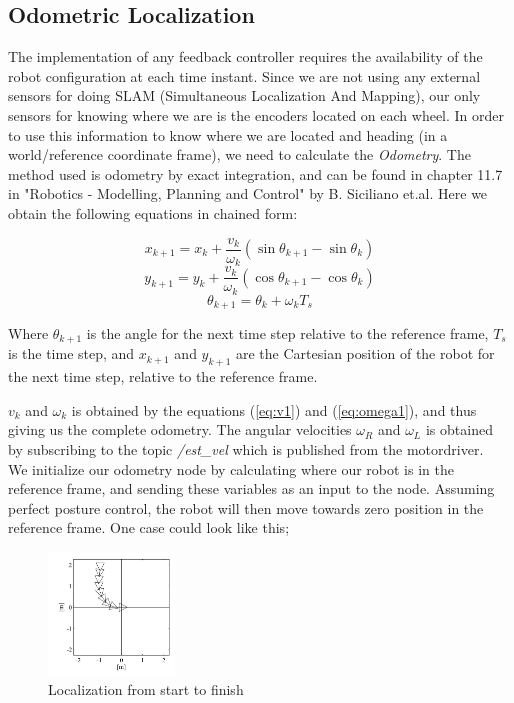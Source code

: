\documentclass[a4paper,10pt]{article}
\begin{document}
\subsection{Odometric Localization}

	The implementation of any feedback controller requires the availability of the robot configuration at each time instant. 
	Since we are not using any external sensors for doing SLAM
	(Simultaneous Localization And Mapping), our only sensors for knowing where we are is the encoders located on each wheel. 
	In order to use this information to know where we are located and heading (in a world/reference coordinate frame), 
	we need to calculate the \emph{Odometry}. The method used is odometry by exact integration, and can be found in chapter 11.7 in
	"Robotics - Modelling, Planning and Control" by B. Siciliano et.al. Here we obtain the following equations in chained form:
	
		\begin{equation}
		x_{k+1}=x_k+\frac{v_k}{\omega_k}(\sin{\theta_{k+1}}-\sin{\theta_k})
		\end{equation}
		\begin{equation}
		y_{k+1}=y_k+\frac{v_k}{\omega_k}(\cos{\theta_{k+1}}-\cos{\theta_k})
		\end{equation}
		\begin{equation}
		\theta_{k+1}=\theta_k+\omega_kT_s
		\end{equation}
		
		Where $\theta_{k+1}$ is the angle for the next time step relative to the reference frame, $T_s$ is the time step, 
		and $x_{k+1}$ and $y_{k+1}$ are the Cartesian position of the robot for the next time step, relative to the reference frame.

		$v_k$ and $\omega_k$ is obtained by the equations (\ref{eq:v1}) and (\ref{eq:omega1}), and thus giving us the complete odometry. 
		The angular velocities $\omega_R$  and $\omega_L$ is obtained by subscribing to
		the topic \textit{/est\_vel} which is published from the motordriver.\\

		We initialize our odometry node by calculating where our robot is in the reference frame, 
		and sending these variables as an input to the node. Assuming perfect posture control, the robot will
		then move towards zero position in the reference frame. One case could look like this;


		\begin{figure}[H]
		\centering
		\includegraphics[width=0.3\textwidth]{odometric_localization_config.JPG}
		\caption{Localization from start to finish}	
 		\label{fig:odometriclocalization}
		\end{figure}
\end{document}
